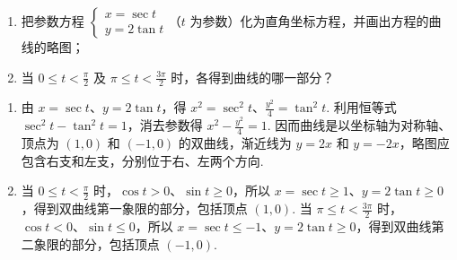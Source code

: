 \begin{problem}
\begin{enumerate}
\item 把参数方程 \(\begin{cases}
x=\sec t\\
y=2\tan t
\end{cases}\)（\(t\) 为参数）化为直角坐标方程，并画出方程的曲线的略图；
\item 当 \(0\leqslant t<\frac{\pi}{2}\) 及 \(\pi\leqslant t<\frac{3\pi}{2}\) 时，各得到曲线的哪一部分？
\end{enumerate}
\end{problem}

\begin{solution}
\begin{enumerate}
\item 由 \(x=\sec t\)、\(y=2\tan t\)，得 \(x^2=\sec^2 t\)、\(\frac{y^2}{4}=\tan^2 t\). 利用恒等式 \(\sec^2 t-\tan^2 t=1\)，消去参数得 \(x^2-\frac{y^2}{4}=1\). 因而曲线是以坐标轴为对称轴、顶点为 \((1,0)\) 和 \((-1,0)\) 的双曲线，渐近线为 \(y=2x\) 和 \(y=-2x\)，略图应包含右支和左支，分别位于右、左两个方向.
\item 当 \(0\leqslant t<\frac{\pi}{2}\) 时，\(\cos t>0\)、\(\sin t\geqslant0\)，所以 \(x=\sec t\geqslant1\)、\(y=2\tan t\geqslant0\)，得到双曲线第一象限的部分，包括顶点 \((1,0)\). 当 \(\pi\leqslant t<\frac{3\pi}{2}\) 时，\(\cos t<0\)、\(\sin t\leqslant0\)，所以 \(x=\sec t\leqslant-1\)、\(y=2\tan t\geqslant0\)，得到双曲线第二象限的部分，包括顶点 \((-1,0)\).
\end{enumerate}
\end{solution}

